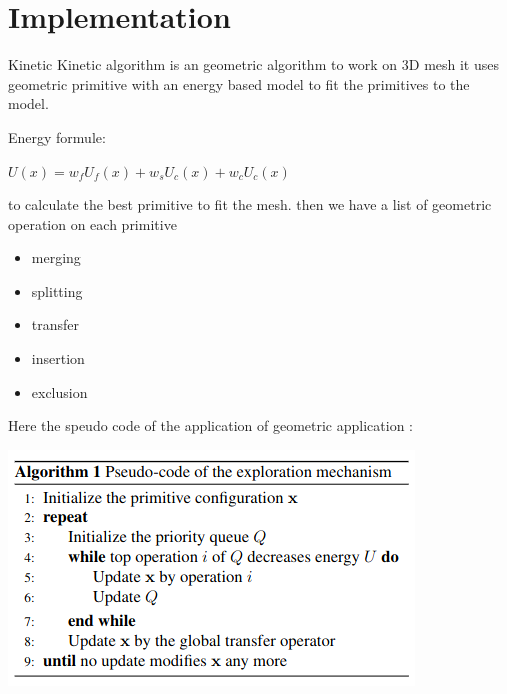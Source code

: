\documentclass[10pt]{beamer}
\begin{document}
\section{Implementation}
\begin{frame}{Kinetic}
Kinetic algorithm is an geometric algorithm to work on 3D mesh it uses  geometric primitive with an energy based model to fit the primitives to the model.

Energy formule: 
\newline
\begin{center}
    $        U(x) = w_f U_f(x) + w_s U_c(x) + w_c U_c(x)       $
\end{center}

to calculate the best primitive to fit the mesh.
then we have a list of geometric operation on each primitive
\begin{itemize}
    \item merging
    \item splitting 
    \item transfer 
    \item insertion
    \item exclusion
\end{itemize}

Here the speudo code of the application of geometric application : 
\begin{center}
    \includegraphics[scale =  0.5]{../../images/Pseudo_code_exploration.png}
  \end{center} 
\end{frame}
\end{document}
